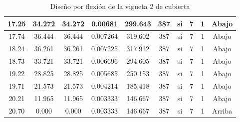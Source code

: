 \begin{table}[H]
{\begin{tabular}{|c|c|c|c|c|c|c|c|c|c|}
    17.25 & 34.272 & 34.272 & 0.00681 & 299.643 & 387 & si  & 7   & 1   & Abajo \bigstrut\\
    \hline
    17.74 & 36.444 & 36.444 & 0.007264 & 319.602 & 387 & si  & 7   & 1   & Abajo \bigstrut\\
    \hline
    18.24 & 36.261 & 36.261 & 0.007225 & 317.912 & 387 & si  & 7   & 1   & Abajo \bigstrut\\
    \hline
    18.73 & 33.721 & 33.721 & 0.006696 & 294.605 & 387 & si  & 7   & 1   & Abajo \bigstrut\\
    \hline
    19.22 & 28.825 & 28.825 & 0.005685 & 250.153 & 387 & si  & 7   & 1   & Abajo \bigstrut\\
    \hline
    19.71 & 21.573 & 21.573 & 0.004214 & 185.418 & 387 & si  & 7   & 1   & Abajo \bigstrut\\
    \hline
    20.21 & 11.965 & 11.965 & 0.003333 & 146.667 & 387 & si  & 7   & 1   & Abajo \bigstrut\\
    \hline
    20.70 & 0.000 & 0.000 & 0.003333 & 146.667 & 387 & si  & 7   & 1   & Arriba \bigstrut\\
    \hline
    \end{tabular}%
   }%
      \caption{Diseño por flexión de la vigueta 2 de cubierta}
  \label{tab:F VT2 CUB}%
\end{table}%
